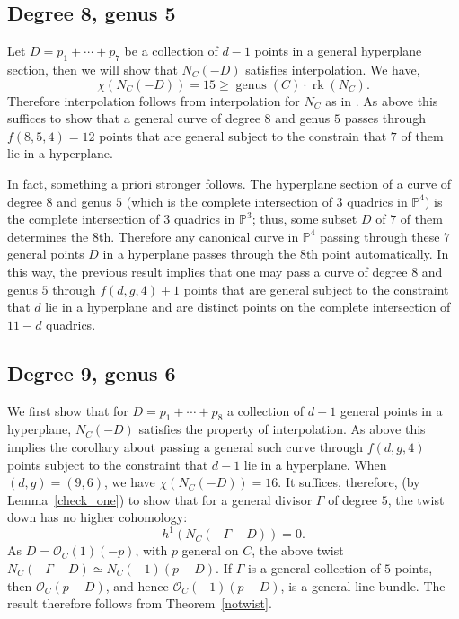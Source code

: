 \documentclass[11pt]{amsart}
\newcommand{\pp}{\mathbb{P}}
\renewcommand{\O}{\mathcal{O}}
\newcommand{\rk}{\operatorname{rk}}
\newcommand{\genus}{\operatorname{genus}}
\theoremstyle{definition}
\theoremstyle{remark}
\begin{document}
\subsection{Degree 8, genus 5}

Let $D = p_1 + \cdots +p_{7}$ be a collection of $d-1$ points in a general hyperplane section, then we will show that $N_C(-D)$ satisfies interpolation.  We have, 
\[\chi(N_C(-D)) = 15 \geq \genus(C)\cdot \rk(N_C).\]
Therefore interpolation follows from interpolation for $N_C$ as in \cite[Proposition 4.12]{joint}.  As above this suffices to show that a general curve of degree $8$ and genus $5$ passes through $f(8,5,4) = 12$ points that are general subject to the constrain that $7$ of them lie in a hyperplane.

In fact, something a priori stronger follows.  The hyperplane section of a curve of degree $8$ and genus $5$ (which is the complete intersection of $3$ quadrics in $\pp^4$) is the complete intersection of $3$ quadrics in $\pp^3$;
thus, some subset $D$ of $7$ of them determines the $8$th.  Therefore any canonical curve in $\pp^4$ passing through these $7$ general points $D$ in a hyperplane passes through the $8$th point automatically.  In this way, the previous result implies that one may pass a curve of degree $8$ and genus $5$ through $f(d,g,4)+1$ points that are general subject to the constraint that $d$ lie in a hyperplane and
are distinct points on the complete intersection of $11 - d$ quadrics.

\subsection{Degree 9, genus 6}

We first show that for $D = p_1 + \cdots +p_{8}$ a collection of $d-1$ general points in a hyperplane, $N_C(-D)$ satisfies the property of interpolation.  As above this implies the corollary about passing a general such curve through $f(d,g,4)$ points subject to the constraint that $d-1$ lie in a hyperplane.
When $(d,g) = (9,6)$, we have $\chi(N_C(-D)) = 16$.   It suffices, therefore, (by Lemma~\ref{check_one}) to show that for a general divisor $\Gamma$ of degree $5$, the twist down has no higher cohomology:
\[h^1(N_C(-\Gamma-D)) = 0.\]
As $D = \O_C(1)(-p)$, with $p$ general on $C$, the above twist $N_C(-\Gamma-D) \simeq N_C(-1)(p-D)$.  If $\Gamma$ is a general collection of $5$ points, then $\O_C(p-D)$, and hence $\O_C(-1)(p-D)$, is a general line bundle.  The result therefore follows from Theorem~\ref{notwist}.
\end{document}
